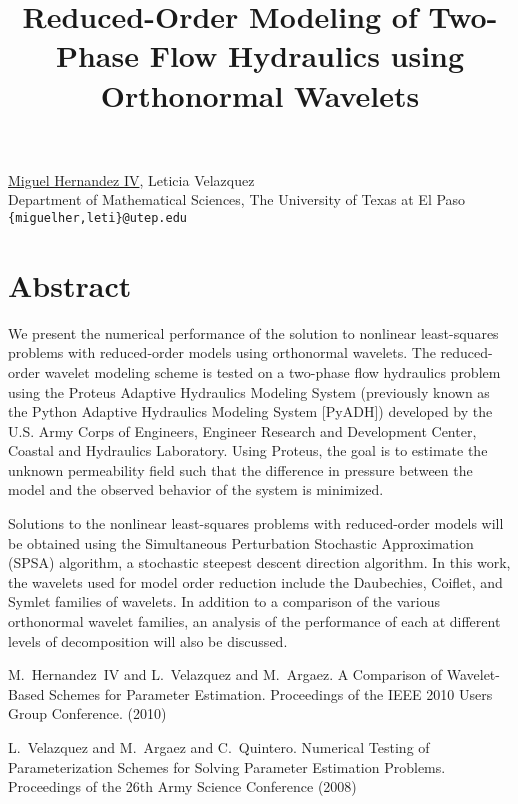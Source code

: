 \title{Reduced-Order Modeling of Two-Phase Flow Hydraulics using Orthonormal Wavelets}
\author{} \institute{}
\maketitle

\begin{center}
{\large \underline{Miguel Hernandez IV}, Leticia Velazquez}\\
Department of Mathematical Sciences, The University of Texas at El Paso\\
{\tt \{miguelher,leti\}@utep.edu}\\
\end{center}

\section*{Abstract}
We present the numerical performance of the solution to nonlinear least-squares problems with reduced-order models using orthonormal wavelets.  The reduced-order wavelet modeling scheme is tested on a two-phase flow hydraulics problem using the Proteus Adaptive Hydraulics Modeling System (previously known as the Python Adaptive Hydraulics Modeling System [PyADH]) developed by the U.S. Army Corps of Engineers, Engineer Research and Development Center, Coastal and Hydraulics Laboratory.  Using Proteus, the goal is to estimate the unknown permeability field such that the difference in pressure between the model and the observed behavior of the system is minimized.

Solutions to the nonlinear least-squares problems with reduced-order models will be obtained using the Simultaneous Perturbation Stochastic Approximation (SPSA) algorithm, a stochastic steepest descent direction algorithm.  In this work, the wavelets used for model order reduction include the Daubechies, Coiflet, and Symlet families of wavelets.  In addition to a comparison of the various orthonormal wavelet families, an analysis of the performance of each at different levels of decomposition will also be discussed.


\begin{thebibliography}{10}
{\sc M.~Hernandez~IV and L.~Velazquez and M.~Argaez}. {A Comparison of Wavelet-Based Schemes for Parameter Estimation}. Proceedings of the IEEE 2010 Users Group Conference. (2010)

{\sc L.~Velazquez and M.~Argaez and C.~Quintero}. {Numerical Testing of Parameterization Schemes for Solving Parameter Estimation Problems.} Proceedings of the 26th Army Science Conference (2008)
\end{thebibliography}